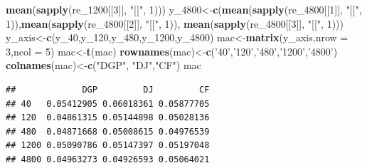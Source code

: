 \documentclass[
]{article}
\newenvironment{Shaded}{\begin{snugshade}}{\end{snugshade}}
\newcommand{\DataTypeTok}[1]{\textcolor[rgb]{0.13,0.29,0.53}{#1}}
\newcommand{\DecValTok}[1]{\textcolor[rgb]{0.00,0.00,0.81}{#1}}
\newcommand{\KeywordTok}[1]{\textcolor[rgb]{0.13,0.29,0.53}{\textbf{#1}}}
\newcommand{\NormalTok}[1]{#1}
\newcommand{\StringTok}[1]{\textcolor[rgb]{0.31,0.60,0.02}{#1}}
\begin{document}
\begin{Shaded}
\begin{Highlighting}[]
        \KeywordTok{mean}\NormalTok{(}\KeywordTok{sapply}\NormalTok{(re_}\DecValTok{1200}\NormalTok{[[}\DecValTok{3}\NormalTok{]], }\StringTok{"[["}\NormalTok{, }\DecValTok{1}\NormalTok{)))}
\NormalTok{y_}\DecValTok{4800}\NormalTok{<-}\KeywordTok{c}\NormalTok{(}\KeywordTok{mean}\NormalTok{(}\KeywordTok{sapply}\NormalTok{(re_}\DecValTok{4800}\NormalTok{[[}\DecValTok{1}\NormalTok{]], }\StringTok{"[["}\NormalTok{, }\DecValTok{1}\NormalTok{)),}\KeywordTok{mean}\NormalTok{(}\KeywordTok{sapply}\NormalTok{(re_}\DecValTok{4800}\NormalTok{[[}\DecValTok{2}\NormalTok{]], }\StringTok{"[["}\NormalTok{, }\DecValTok{1}\NormalTok{)),}
        \KeywordTok{mean}\NormalTok{(}\KeywordTok{sapply}\NormalTok{(re_}\DecValTok{4800}\NormalTok{[[}\DecValTok{3}\NormalTok{]], }\StringTok{"[["}\NormalTok{, }\DecValTok{1}\NormalTok{)))}
\NormalTok{y_axis<-}\KeywordTok{c}\NormalTok{(y_}\DecValTok{40}\NormalTok{,y_}\DecValTok{120}\NormalTok{,y_}\DecValTok{480}\NormalTok{,y_}\DecValTok{1200}\NormalTok{,y_}\DecValTok{4800}\NormalTok{)}
\NormalTok{mac<-}\KeywordTok{matrix}\NormalTok{(y_axis,}\DataTypeTok{nrow =} \DecValTok{3}\NormalTok{,}\DataTypeTok{ncol =} \DecValTok{5}\NormalTok{)}
\NormalTok{mac<-}\KeywordTok{t}\NormalTok{(mac)}
\KeywordTok{rownames}\NormalTok{(mac)<-}\KeywordTok{c}\NormalTok{(}\StringTok{'40'}\NormalTok{,}\StringTok{'120'}\NormalTok{,}\StringTok{'480'}\NormalTok{,}\StringTok{'1200'}\NormalTok{,}\StringTok{'4800'}\NormalTok{)}
\KeywordTok{colnames}\NormalTok{(mac)<-}\KeywordTok{c}\NormalTok{(}\StringTok{"DGP"}\NormalTok{, }\StringTok{"DJ"}\NormalTok{,}\StringTok{"CF"}\NormalTok{)}
\NormalTok{mac}
\end{Highlighting}
\end{Shaded}

\begin{verbatim}
##             DGP         DJ         CF
## 40   0.05412905 0.06018361 0.05877705
## 120  0.04861315 0.05144898 0.05028136
## 480  0.04871668 0.05008615 0.04976539
## 1200 0.05090786 0.05147397 0.05197048
## 4800 0.04963273 0.04926593 0.05064021
\end{verbatim}
\end{document}
